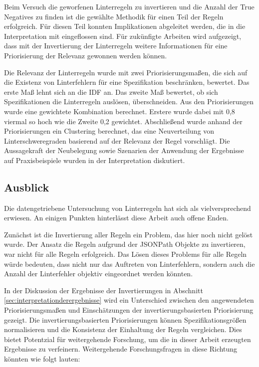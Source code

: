   Beim Versuch die geworfenen Linterregeln zu invertieren und die Anzahl der True Negatives zu finden ist die gewählte Methodik für einen Teil der Regeln erfolgreich. Für diesen Teil konnten Implikationen abgeleitet werden, die in die Interpretation mit eingeflossen sind. Für zukünfigte Arbeiten wird aufgezeigt, dass mit der Invertierung der Linterregeln weitere Informationen für eine Priorisierung der Relevanz gewonnen werden können.
  
  Die Relevanz der Linterregeln wurde mit zwei Priorisierungsmaßen, die sich auf die Existenz von Linterfehlern für eine Spezifikation beschränken, bewertet. Das erste Maß lehnt sich an die \acl{IDF} an. Das zweite Maß bewertet, ob sich Spezifikationen die Linterregeln auslösen, überschneiden. Aus den Priorisierungen wurde eine gewichtete Kombination berechnet. Erstere wurde dabei mit 0,8 viermal so hoch wie die Zweite 0,2 gewichtet. Abschließend wurde anhand der Priorisierungen ein Clustering berechnet, das eine Neuverteilung von Linterschweregraden basierend auf der Relevanz der Regel vorschlägt. Die Aussagekraft der Neubelegung sowie Szenarien der Anwendung der Ergebnisse auf Praxisbeispiele wurden in der Interpretation diskutiert.

\subsection{Ausblick} \label{sec:ausblick}
  Die datengetriebene Untersuchung von Linterregeln hat sich als vielversprechend erwiesen. An einigen Punkten hinterlässt diese Arbeit auch offene Enden.

  Zunächst ist die Invertierung aller Regeln ein Problem, das hier noch nicht gelöst wurde. Der Ansatz die Regeln aufgrund der JSONPath Objekte zu invertieren, war nicht für alle Regeln erfolgreich. Das Lösen dieses Problems für alle Regeln würde bedeuten, dass nicht nur das Auftreten von Linterfehlern, sondern auch die Anzahl der Linterfehler objektiv eingeordnet werden könnten.

  In der Diskussion der Ergebnisse der Invertierungen in Abschnitt \ref{sec:interpretationderergebnisse} wird ein Unterschied zwischen den angewendeten Priorisierungsmaßen und Einschätzungen der invertierungsbasierten Priorisierung gezeigt. Die invertierungsbasierten Priorisierungen können Spezifikationsgrößen normalisieren und die Konsistenz der Einhaltung der Regeln vergleichen. Dies bietet Potentzial für weitergehende Forschung, um die in dieser Arbeit erzeugten Ergebnisse zu verfeinern. Weitergehende Forschungsfragen in diese Richtung könnten wie folgt lauten:

